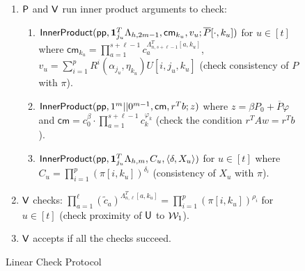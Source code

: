 \begin{figure}[h]
{\begin{framed}
\begin{enumerate}[{\rm 1.}]
				\item $\mathsf{P}$ and $\mathsf{V}$ run inner product arguments to check:
				\begin{enumerate}
					\item $\mathsf{InnerProduct}(\mathsf{pp},\bm{1}_{j_u}^T\Lambda_{h,2m-1},\mathsf{cm}_{k_u},v_u;\overline{P}[\cdot,k_u])$ 
					for $u\in [t]$ where $\mathsf{cm}_{k_u}=\prod_{a=1}^{s+\ell-1}c_a^{\Lambda^T_{n,s+\ell-1}[a,k_u]}$, 
					$v_u=\sum_{i=1}^pR^i(\alpha_{j_u},\eta_{k_u})U[i,j_u,k_u]$ (check consistency of $P$ with $\pi$).
					\item $\mathsf{InnerProduct}(\mathsf{pp},1^m||0^{m-1},\mathsf{cm},r^Tb;z)$ where $z=\beta P_0+\overline{P}\varphi$ and $\mathsf{cm}=c_0^{\beta}\cdot \prod_{a=1}^{s+\ell-1}c_k^{\varphi_k}$ (check the condition $r^TAw=r^Tb$).
					\item $\mathsf{InnerProduct}(\mathsf{pp},\bm{1}_{j_u}^T\Lambda_{h,m},C_u,\langle \delta,X_u\rangle)$ for $u\in [t]$ 
					where $C_u=\prod_{i=1}^p(\pi[i,k_u])^{\delta_i}$ (consistency of $X_u$ with $\pi$). 
				\end{enumerate}
				\item $\mathsf{V}$ checks: $\prod_{a=1}^\ell(\tilde{c}_a)^{\Lambda^T_{n,\ell}[a,k_u]}=\prod_{i=1}^p(\pi[i,k_u])^{\rho_i}$ for $u\in [t]$ (check proximity of $\mathsf{U}$ to $\mathcal{W}_1$).
				\item $\mathsf{V}$ accepts if all the checks succeed.
			\end{enumerate}
		\end{framed}
		\caption{Linear Check Protocol}
		\label{fig:linearcheck}
	}
\end{figure}
